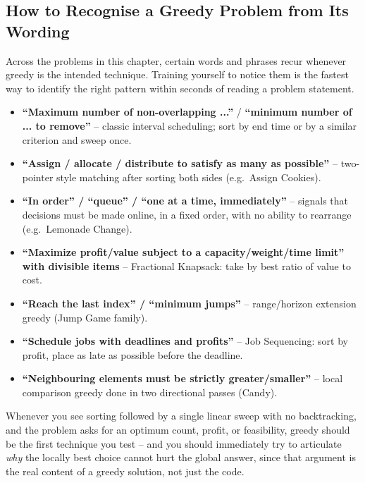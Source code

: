 \subsection*{How to Recognise a Greedy Problem from Its Wording}

Across the problems in this chapter, certain words and phrases recur whenever
greedy is the intended technique. Training yourself to notice them is the
fastest way to identify the right pattern within seconds of reading a problem
statement.

\begin{patternbox}
\begin{itemize}
  \item \textbf{``Maximum number of non-overlapping ...''} / \textbf{``minimum
        number of ... to remove''} -- classic interval scheduling; sort by end
        time or by a similar criterion and sweep once.
  \item \textbf{``Assign / allocate / distribute to satisfy as many as
        possible''} -- two-pointer style matching after sorting both sides
        (e.g.\ Assign Cookies).
  \item \textbf{``In order'' / ``queue'' / ``one at a time, immediately''} --
        signals that decisions must be made online, in a fixed order, with no
        ability to rearrange (e.g.\ Lemonade Change).
  \item \textbf{``Maximize profit/value subject to a capacity/weight/time
        limit'' with divisible items} -- Fractional Knapsack: take by best
        ratio of value to cost.
  \item \textbf{``Reach the last index'' / ``minimum jumps''} -- range/horizon
        extension greedy (Jump Game family).
  \item \textbf{``Schedule jobs with deadlines and profits''} -- Job
        Sequencing: sort by profit, place as late as possible before the
        deadline.
  \item \textbf{``Neighbouring elements must be strictly greater/smaller''} --
        local comparison greedy done in two directional passes (Candy).
\end{itemize}
Whenever you see sorting followed by a single linear sweep with no
backtracking, and the problem asks for an optimum count, profit, or
feasibility, greedy should be the first technique you test -- and you should
immediately try to articulate \emph{why} the locally best choice cannot hurt
the global answer, since that argument is the real content of a greedy
solution, not just the code.
\end{patternbox}


